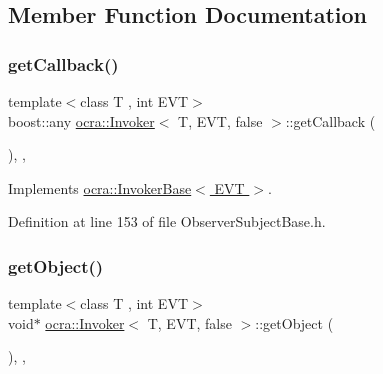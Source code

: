 \subsection{Member Function Documentation}
\hypertarget{classocra_1_1Invoker_3_01T_00_01EVT_00_01false_01_4_a459bd95f3eae2d06b9167fd98c1c7e22}{}\label{classocra_1_1Invoker_3_01T_00_01EVT_00_01false_01_4_a459bd95f3eae2d06b9167fd98c1c7e22} 
\subsubsection{\texorpdfstring{get\+Callback()}{getCallback()}}
{\footnotesize\ttfamily template$<$class T , int E\+VT$>$ \\
boost\+::any \hyperlink{classocra_1_1Invoker}{ocra\+::\+Invoker}$<$ T, E\+VT, false $>$\+::get\+Callback (\begin{DoxyParamCaption}{ }\end{DoxyParamCaption})\hspace{0.3cm}{\ttfamily [inline]}, {\ttfamily [protected]}, {\ttfamily [virtual]}}



Implements \hyperlink{classocra_1_1InvokerBase_aab9488dbb26120ccfa7c77be11c01ba9}{ocra\+::\+Invoker\+Base$<$ E\+V\+T $>$}.



Definition at line 153 of file Observer\+Subject\+Base.\+h.

\hypertarget{classocra_1_1Invoker_3_01T_00_01EVT_00_01false_01_4_ad77a4342ddfd1b1e1387065276c54246}{}\label{classocra_1_1Invoker_3_01T_00_01EVT_00_01false_01_4_ad77a4342ddfd1b1e1387065276c54246} 
\subsubsection{\texorpdfstring{get\+Object()}{getObject()}}
{\footnotesize\ttfamily template$<$class T , int E\+VT$>$ \\
void$\ast$ \hyperlink{classocra_1_1Invoker}{ocra\+::\+Invoker}$<$ T, E\+VT, false $>$\+::get\+Object (\begin{DoxyParamCaption}{ }\end{DoxyParamCaption})\hspace{0.3cm}{\ttfamily [inline]}, {\ttfamily [protected]}, {\ttfamily [virtual]}}



